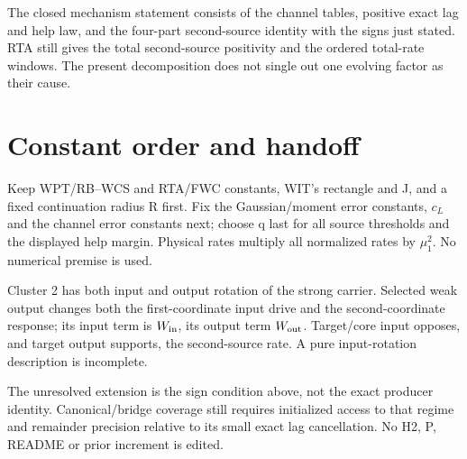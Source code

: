 \documentclass[11pt]{article}
\begin{document}
The closed mechanism statement consists of the channel tables, positive
exact lag and help law, and the four-part second-source identity with the
signs just stated. RTA still gives the total second-source positivity
and the ordered total-rate windows. The present decomposition does not
single out one evolving factor as their cause.

\section{Constant order and handoff}\label{an01cpdv1:handoff}
Keep WPT/RB--WCS and RTA/FWC constants, WIT's rectangle and J, and a
fixed continuation radius R first. Fix the Gaussian/moment error constants,
\(c_L\) and the channel error constants next; choose q last for all
source thresholds and the displayed help margin. Physical rates multiply
all normalized rates by \(\mu_1^2\). No numerical premise is used.

Cluster 2 has both input and
output rotation of the strong carrier. Selected weak output changes both
the first-coordinate input drive and the second-coordinate response;
its input term is \(W_{\rm in}\), its output term \(W_{\rm out}\).
Target/core input opposes, and target output supports, the second-source
rate. A pure input-rotation description is incomplete.

The unresolved extension is the sign condition above, not the exact
producer identity. Canonical/bridge coverage still requires initialized
access to that regime and remainder precision relative to its small
exact lag cancellation. No H2, P, README or prior increment is edited.
\end{document}
